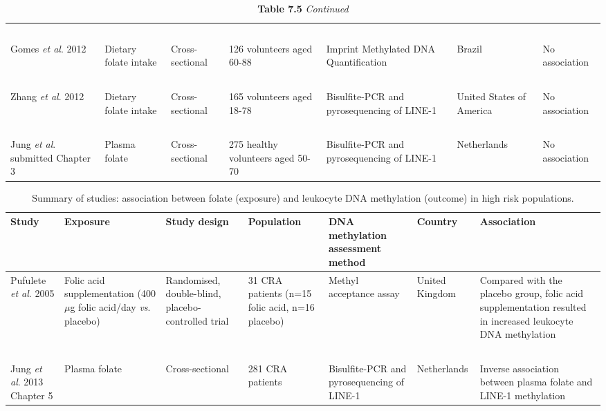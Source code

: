 \begin{center} 
\begin{sidewaystable}
\small
\caption*{\textbf{Table 7.5} \emph{Continued}} 
\label{table7_5}
\begin{tabular}{L{1.8cm}C{1.8cm}C{1.8cm}L{2.2cm}C{2.7cm}C{1.8cm}C{2.5cm}} 
~ & ~ & ~ & ~ & ~ & ~ & ~\\
Gomes \textit{et al}. 2012 \cite{c79} &
Dietary folate intake &
Cross-sectional &
126 volunteers aged 60-88 &
Imprint Methylated DNA Quantification &
Brazil &
No association\\
~ & ~ & ~ & ~ & ~ & ~ & ~\\
Zhang \textit{et al}. 2012 \cite{c711} &
Dietary folate intake &
Cross-sectional &
165 volunteers aged 18-78 &
Bisulfite-PCR and pyrosequencing of LINE-1 &
United States of America &
No association\\
~ & ~ & ~ & ~ & ~ & ~ & ~\\
{Jung \textit{et al}. submitted \cite{c77}} Chapter 3 &
Plasma folate &
Cross-sectional &
{ 275 healthy volunteers} aged 50-70 &
Bisulfite-PCR and pyrosequencing of LINE-1 &
Netherlands &
No association\\
\hline
\end{tabular}
\end{sidewaystable}
\end{center}


\vspace{0pt}
\begin{sidewaystable}
\normalsize
\caption{Summary of studies: association between folate (exposure) and leukocyte DNA methylation (outcome) in high risk populations.} 
\label{table7_6}
\renewcommand{\arraystretch}{1}
\begin{tabular}{L{2cm}C{2cm}C{2cm}C{2cm}C{2.5cm}C{1.5cm}C{3cm}} 
\hline\bfseries Study & \bfseries Exposure & \bfseries Study design & \bfseries Population & \bfseries DNA methylation assessment 
method & \bfseries Country & \bfseries Association\\
\hline
Pufulete \textit{et al}. 2005 \cite{c713} &
Folic acid supplementation (400 $\mu$g folic acid/day \textit{vs}. placebo) &
Randomised, double-blind, placebo-controlled trial &
31 CRA patients (n=15 folic acid, n=16 placebo) &
Methyl acceptance assay &
United Kingdom &
Compared with the placebo group, folic acid supplementation resulted in increased leukocyte DNA methylation\\
~ & ~ & ~ & ~ & ~ & ~ & ~\\
{ {Jung }{\textit{et al}}{. 2013 }\cite{c714}} 
Chapter 5 &
Plasma folate &
Cross-sectional &
281 CRA patients &
Bisulfite-PCR and pyrosequencing of LINE-1 &
Netherlands &
Inverse association between plasma folate and LINE-1 methylation\\
\hline
\end{tabular}
\end{sidewaystable} 



